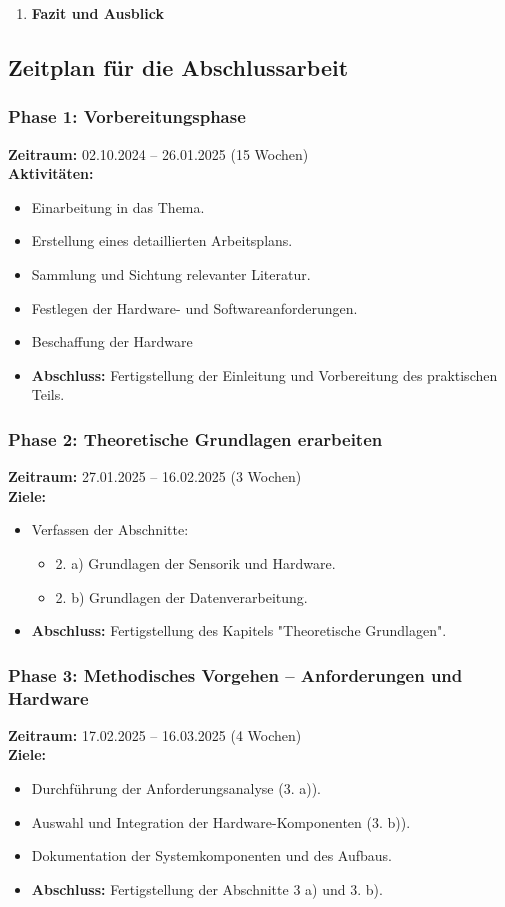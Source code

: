 \documentclass{scrartcl}
\begin{document}
\begin{enumerate}
	\item \textbf{Fazit und Ausblick}
\end{enumerate}

\subsection*{Zeitplan für die Abschlussarbeit}

\subsubsection*{Phase 1: Vorbereitungsphase}
\textbf{Zeitraum:} 02.10.2024 – 26.01.2025 (15 Wochen)  \\
\textbf{Aktivitäten:}
\begin{itemize}
	\item Einarbeitung in das Thema.
	\item Erstellung eines detaillierten Arbeitsplans.
	\item Sammlung und Sichtung relevanter Literatur.
	\item Festlegen der Hardware- und Softwareanforderungen.
	\item Beschaffung der Hardware
	\item \textbf{Abschluss:} Fertigstellung der Einleitung und Vorbereitung des praktischen Teils.
\end{itemize}

\subsubsection*{Phase 2: Theoretische Grundlagen erarbeiten}
\textbf{Zeitraum:} 27.01.2025 – 16.02.2025 (3 Wochen)  \\
\textbf{Ziele:}
\begin{itemize}
	\item Verfassen der Abschnitte:
	\begin{itemize}
		\item 2. a) Grundlagen der Sensorik und Hardware.
		\item 2. b) Grundlagen der Datenverarbeitung.
	\end{itemize}
	\item \textbf{Abschluss:} Fertigstellung des Kapitels "Theoretische Grundlagen".
\end{itemize}

\subsubsection*{Phase 3: Methodisches Vorgehen – Anforderungen und Hardware}
\textbf{Zeitraum:} 17.02.2025 – 16.03.2025 (4 Wochen)  \\
\textbf{Ziele:}
\begin{itemize}
	\item Durchführung der Anforderungsanalyse (3. a)).
	\item Auswahl und Integration der Hardware-Komponenten (3. b)).
	\item Dokumentation der Systemkomponenten und des Aufbaus.
	\item \textbf{Abschluss:} Fertigstellung der Abschnitte 3 a) und 3. b).
\end{itemize}
\end{document}
